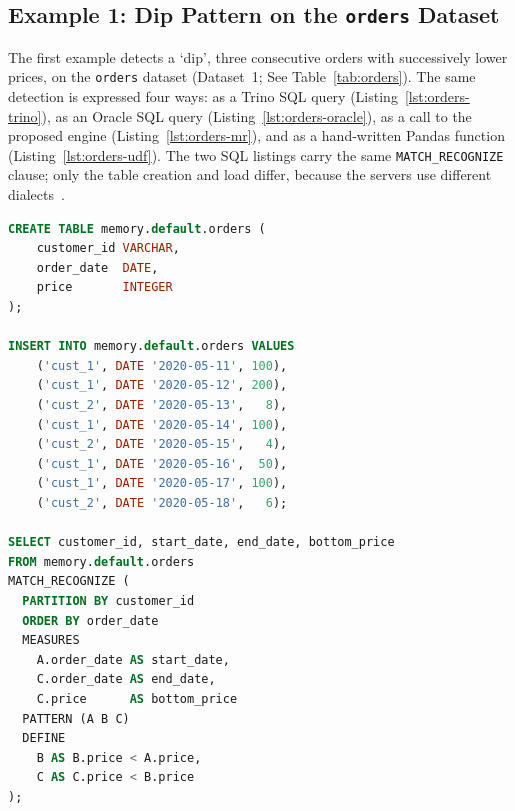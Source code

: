 \subsection{Example 1: Dip Pattern on the \texttt{orders} Dataset}
\label{subsec:eval-dip}

The first example detects a `dip', three consecutive orders with
successively lower prices, on the \texttt{orders} dataset
(Dataset~1; See Table~\ref{tab:orders}).  The same detection is expressed
four ways: as a Trino SQL query (Listing~\ref{lst:orders-trino}), as an
Oracle SQL query (Listing~\ref{lst:orders-oracle}), as a call to the
proposed engine (Listing~\ref{lst:orders-mr}), and as a hand-written
Pandas function (Listing~\ref{lst:orders-udf}).  The two SQL listings
carry the same \texttt{MATCH\_RECOGNIZE} clause; only the table
creation and load differ, because the servers use different
dialects~\cite{monierashraf2025oracle}.

\begin{lstlisting}[float=htbp,language=SQL,
  caption={[Trino SQL for the dip pattern]Trino SQL: create and load the \texttt{orders} table, then detect the dip pattern with \texttt{MATCH\_RECOGNIZE}.},
  label={lst:orders-trino}]
CREATE TABLE memory.default.orders (
    customer_id VARCHAR,
    order_date  DATE,
    price       INTEGER
);

INSERT INTO memory.default.orders VALUES
    ('cust_1', DATE '2020-05-11', 100),
    ('cust_1', DATE '2020-05-12', 200),
    ('cust_2', DATE '2020-05-13',   8),
    ('cust_1', DATE '2020-05-14', 100),
    ('cust_2', DATE '2020-05-15',   4),
    ('cust_1', DATE '2020-05-16',  50),
    ('cust_1', DATE '2020-05-17', 100),
    ('cust_2', DATE '2020-05-18',   6);

SELECT customer_id, start_date, end_date, bottom_price
FROM memory.default.orders
MATCH_RECOGNIZE (
  PARTITION BY customer_id
  ORDER BY order_date
  MEASURES
    A.order_date AS start_date,
    C.order_date AS end_date,
    C.price      AS bottom_price
  PATTERN (A B C)
  DEFINE
    B AS B.price < A.price,
    C AS C.price < B.price
);
\end{lstlisting}


